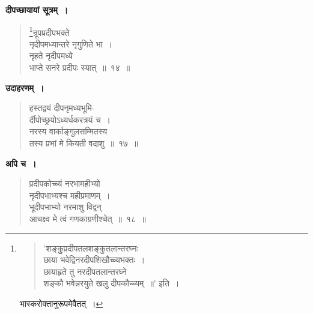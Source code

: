\documentclass[11pt, openany]{book}
\begin{document}
\textbf{दीपच्छायायां सूत्रम्~।}
\begin{quote}
\renewcommand{\thefootnote}{१}\footnote{
\vspace{-5mm}
\begin{quote}
{\qt 'शङ्कुुप्रदीपतलशङ्कुतलान्तरघ्नः\\
छाया भवेद्विनरदीपशिखौच्च्यभक्तः~।\\
छायाहृते तु नरदीपतलान्तरघ्ने\\
शङ्कौ भवेन्नरयुते खलु दीपकौच्च्यम्~॥'} इति~।
\end{quote}

\hspace{2mm} {\qt भास्करो}क्तानुरूपमेवैतत्~।}{\gk न्रूपप्रदीपभक्ते\\
नृदीपमध्यान्तरे नृगुणिते भा~।\\
नृहते नृदीपमध्ये\\
भाप्ते सनरे प्रदीपः स्यात्~॥~१४~॥}	
\end{quote}

\textbf{उदाहरणम्~।}
\begin{quote}
{\ex हस्तद्वयं दीपनृमध्यभूमि-\\
र्दीपोच्छ्रयोऽध्यर्धकरत्रयं च~।\\
नरस्य वार्काङ्गुलसम्मितस्य\\
तस्य प्रभां मे कियती वदाशु~॥~१७~॥}
\end{quote}

\newpage

\textbf{अपि च~।}

\begin{quote}
{\ex प्रदीपकोच्च्यं नरभामहीभ्यो\\
नृदीपभाभ्यश्च महीप्रमाणम्~।\\
भूदीपभाभ्यो नरमाशु विद्वन्\\
आचक्ष्व मे त्वं गणकाग्रणीश्चेत्~॥~१८~॥}
\end{quote}

\begin{minipage}[c]{0.3\textwidth}
\end{minipage} 
\hspace{2mm}
\begin{minipage}{0.4\textwidth} 
\end{minipage} 
\vspace{2mm}
\end{document}
